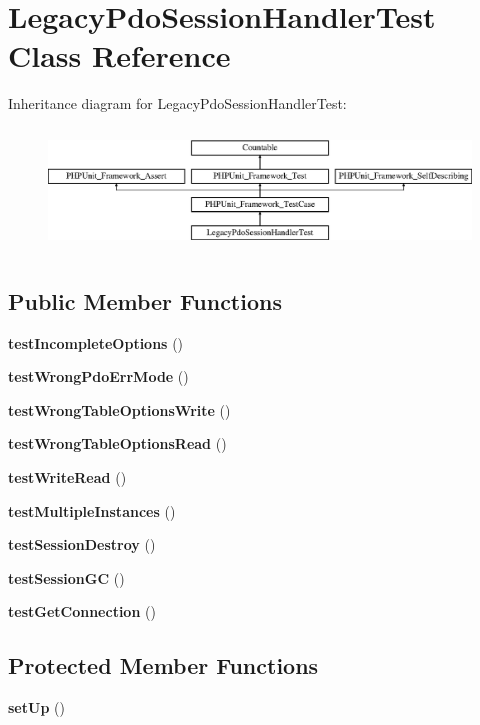 \section{Legacy\+Pdo\+Session\+Handler\+Test Class Reference}
\label{class_symfony_1_1_component_1_1_http_foundation_1_1_tests_1_1_session_1_1_storage_1_1_handler_1_eb7bfaa0362a9f47ee5182367b4a9d83}
Inheritance diagram for Legacy\+Pdo\+Session\+Handler\+Test\+:\begin{figure}[H]
\begin{center}
\leavevmode
\includegraphics[height=3.303835cm]{class_symfony_1_1_component_1_1_http_foundation_1_1_tests_1_1_session_1_1_storage_1_1_handler_1_eb7bfaa0362a9f47ee5182367b4a9d83}
\end{center}
\end{figure}
\subsection*{Public Member Functions}
\begin{DoxyCompactItemize}
\item 
{\bf test\+Incomplete\+Options} ()
\item 
{\bf test\+Wrong\+Pdo\+Err\+Mode} ()
\item 
{\bf test\+Wrong\+Table\+Options\+Write} ()
\item 
{\bf test\+Wrong\+Table\+Options\+Read} ()
\item 
{\bf test\+Write\+Read} ()
\item 
{\bf test\+Multiple\+Instances} ()
\item 
{\bf test\+Session\+Destroy} ()
\item 
{\bf test\+Session\+G\+C} ()
\item 
{\bf test\+Get\+Connection} ()
\end{DoxyCompactItemize}
\subsection*{Protected Member Functions}
\begin{DoxyCompactItemize}
\item 
{\bf set\+Up} ()
\end{DoxyCompactItemize}
